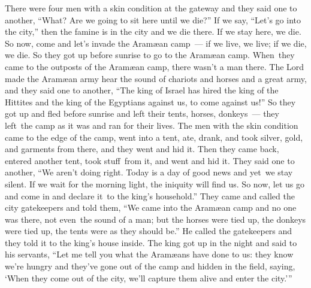 \begin{inparaenum}
   There were four men with a skin condition at the gateway and they said one to another, ``What? Are we going to sit here until we die?''%
   If we say, ``Let's go into the city,'' then the famine is in the city and we die there. If we stay here, we die. So now, come and let's invade the Aram\ae{}an camp~--- if we live, we live; if we die, we die.%
   So they got up before sunrise to go to the Aram\ae{}an camp. When\understood\ they came to the outposts of the Aram\ae{}an camp, there wasn't a man there.%
   The Lord made the Aram\ae{}an army hear the sound of chariots and horses and a great army, and they said one to another, ``The king of Israel has hired the king of the Hittites and the king of the Egyptians against us, to come against us!''%
   So they got up and fled before sunrise and left their tents, horses, donkeys~--- they left\understood\ the camp as it was and ran for their lives.%
   The men with the skin condition came to the edge of the camp, went into a tent, ate, drank, and took silver, gold, and garments from there, and they went and hid it. Then they came back, entered another tent, took stuff\understood\ from it, and went and hid it.%
   They said one to another, ``We aren't doing right. Today is a day of good news and yet\understood\ we stay silent. If we wait for the morning light, the iniquity will find us. So now, let us go and come in and declare it\understood\ to the king's household.''%
   They came and called the city gatekeepers and told them, ``We came into the Aram\ae{}an camp and no one was there, not even\understood\ the sound of a man; but the horses were tied up, the donkeys were tied up, the tents were as they should be.''\thinspace\understood%
   He called the gatekeepers and they told it to the king's house inside.%
   The king got up in the night and said to his servants, ``Let me tell you what the Aram\ae{}ans have done to us: they know we're hungry and they've gone out of the camp and hidden in the field, saying, `When they come out of the city, we'll capture them alive and enter the city.'\thinspace''%

\end{inparaenum}
